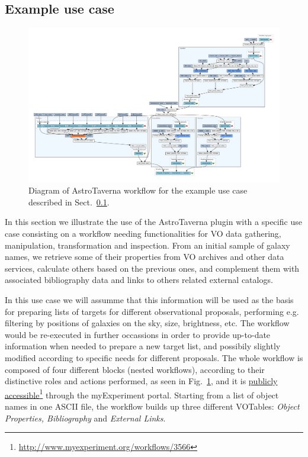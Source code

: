 \documentclass[final,authoryear,5p,times,twocolumn]{elsarticle}
\newcommand{\urlsamefont}[1]{\urlstyle{same}\url{#1}}
\newcommand{\hrefnote}[2]{\href{#1}{#2}\footnote{\urlsamefont{#1}}}
\begin{document}
\subsection{Example use case}
\label{Usecase}

\begin{figure}[tb]
\centering 
\includegraphics[width=17cm]{WfDiagram.pdf}
\caption{Diagram of AstroTaverna workflow for the example use case described in Sect.~\ref{Usecase}.}
\label{fig:WfDiagram}
\end{figure}

In this section we illustrate the use of the AstroTaverna plugin with a specific use case consisting on a workflow needing functionalities for VO data gathering, manipulation, transformation and inspection. From an initial sample of galaxy names, we retrieve some of their properties from VO archives and other data services, calculate others based on the previous ones, and complement them with associated bibliography data and links to others related external catalogs.

In this use case we will assumme that this information will be used as the basis for preparing lists of targets for different observational proposals, performing e.g. filtering by positions of galaxies on the sky, size, brightness, etc. The workflow would be re-executed in further occassions in order to provide up-to-date information when needed to prepare a new target list, and possibily slightly modified according to specific needs for different proposals. The whole workflow is composed of four different blocks (nested workflows), according to their distinctive roles and actions performed, as seen in Fig.~\ref{fig:WfDiagram}, and it is \hrefnote{http://www.myexperiment.org/workflows/3566}{publicly accessible} through the myExperiment portal. Starting from a list of object names in one ASCII file, the workflow builds up three different VOTables: \textit{Object Properties, Bibliography} and \textit{External Links}.
\end{document}
